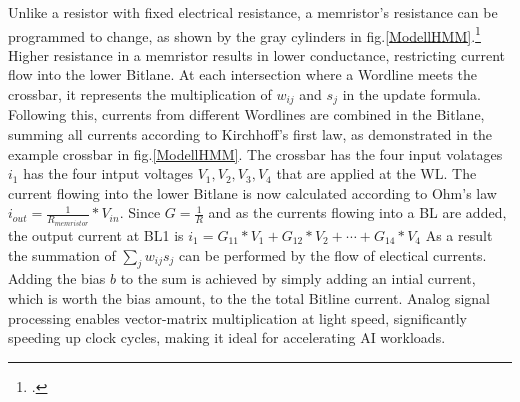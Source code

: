 Unlike a resistor with fixed electrical resistance, a memristor’s resistance can be programmed to change, as shown by the gray cylinders in fig.\ref{ModellHMM}.\footcite[cf][124]{sungPerspectiveReviewMemristive2018}
Higher resistance in a memristor results in lower conductance, restricting current flow into the lower Bitlane.
At each intersection where a Wordline meets the crossbar, it represents the multiplication of \(w_{ij}\) and \(s_j\) 
in the update formula.
Following this, currents from different Wordlines are combined in the Bitlane, summing all currents according to Kirchhoff's first law, as demonstrated in the example crossbar in fig.\ref{ModellHMM}.
The crossbar has the four input volatages \(i_{1}\) has the four intput voltages \(V_{1}, V_{2}, V_{3}, V_{4}\) that are applied at the WL.
The current flowing into the lower Bitlane is now calculated according to Ohm's law \( i_{out} = \frac{1}{R_{memristor}} * V_{in}\).
Since \( G = \frac{1}{R}\) and as the currents flowing into a BL are added, the output current at BL1 is \( i_{1} = G_{11}*V_1 + G_{12}*V_2 + \cdots + G_{14}*V_4\)
As a result the summation of \(\sum_j w_{ij} s_j\) can be performed by the flow of electical currents.
Adding the bias \(b\) to the sum is achieved by simply adding an intial current, which is worth the bias amount, to the the total Bitline current.
Analog signal processing enables vector-matrix multiplication at light speed, significantly speeding up clock cycles, making it ideal for accelerating AI workloads.

